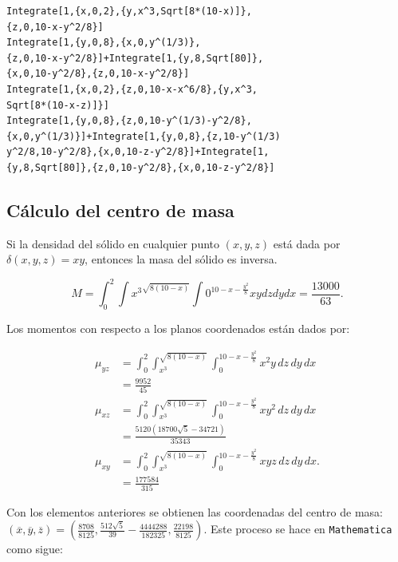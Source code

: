 %

\begin{tcolorbox}[title=\bf Instrucción en \verb"Mathematica"]\begin{Verbatim}[formatcom=\letraverbatim]
Integrate[1,{x,0,2},{y,x^3,Sqrt[8*(10-x)]},
{z,0,10-x-y^2/8}]
Integrate[1,{y,0,8},{x,0,y^(1/3)},
{z,0,10-x-y^2/8}]+Integrate[1,{y,8,Sqrt[80]},
{x,0,10-y^2/8},{z,0,10-x-y^2/8}]
Integrate[1,{x,0,2},{z,0,10-x-x^6/8},{y,x^3,
Sqrt[8*(10-x-z)]}]
Integrate[1,{y,0,8},{z,0,10-y^(1/3)-y^2/8},
{x,0,y^(1/3)}]+Integrate[1,{y,0,8},{z,10-y^(1/3)
y^2/8,10-y^2/8},{x,0,10-z-y^2/8}]+Integrate[1,
{y,8,Sqrt[80]},{z,0,10-y^2/8},{x,0,10-z-y^2/8}]
\end{Verbatim}
\end{tcolorbox}

\subsection{Cálculo del centro de masa}

Si la densidad del sólido en cualquier punto {\small $(x,y,z)$} está dada por {\small $\delta(x,y,z)=xy$,} entonces la masa del sólido es inversa.

{\small
\[M=\int _0^2\int {x^3}^{\sqrt{8 (10-x)}}\int 0^{10-x-\frac{y^2}{8}}xydzdydx=\frac{13000}{63}.\]
}

Los momentos con respecto a los planos coordenados están dados por:

{\footnotesize
\begin{align*}
\mu_{yz} &= \int _0^2\int _{x^3}^{\sqrt{8 (10-x)}}\int _0^{10-x-\frac{y^2}{8}} x^2y\,dz\,dy\,dx \\
&= \frac{9952}{45} \\[1ex]
\mu_{xz} &= \int _0^2\int _{x^3}^{\sqrt{8 (10-x)}}\int _0^{10-x-\frac{y^2}{8}} xy^2\,dz\,dy\,dx \\
&= \frac{5120 \left(18700 \sqrt{5}-34721\right)}{35343} \\[1ex]
\mu_{xy} &= \int _0^2\int _{x^3}^{\sqrt{8 (10-x)}}\int _0^{10-x-\frac{y^2}{8}} xyz\,dz\,dy\,dx. \\
&= \frac{177584}{315}
\end{align*}
}

Con los elementos anteriores se obtienen las coordenadas del centro de masa:
$(\overline{x},\overline{y},\overline{z})=\left(\frac{8708}{8125},\frac{512 \sqrt{5}}{39}-\frac{4444288}{182325},\frac{22198}{8125}\right)$.
Este proceso se hace en \verb"Mathematica" como sigue:

